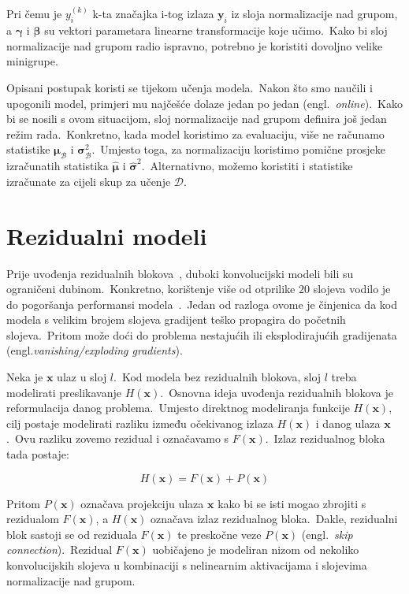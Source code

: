 \documentclass[diplomskirad]{fer}
\begin{document}
Pri čemu je $y_i^{(k)}$ k-ta značajka i-tog izlaza $\bm{y}_i$ iz sloja normalizacije nad grupom, a $\bm{\gamma}$ i $\bm{\beta}$ su vektori parametara linearne transformacije koje učimo.\ 
Kako bi sloj normalizacije nad grupom radio ispravno, potrebno je koristiti dovoljno velike minigrupe.\ 

Opisani postupak koristi se tijekom učenja modela.\ Nakon što smo naučili i upogonili model, primjeri mu najčešće dolaze jedan po jedan (engl.\ \textit{online}).\ 
Kako bi se nosili s ovom situacijom, sloj normalizacije nad grupom definira još jedan režim rada.\ 
Konkretno, kada model koristimo za evaluaciju, više ne računamo statistike $\bm{\mu}_{\mathcal{B}}$ i $\bm{\sigma}_{\mathcal{B}}^2$.\ 
Umjesto toga, za normalizaciju koristimo pomične prosjeke izračunatih statistika $\bm{\hat{\mu}}$ i $\bm{\hat{\sigma}}^2$.\ Alternativno, možemo koristiti i statistike izračunate za cijeli skup za učenje $\mathcal{D}$.\

\pagebreak

\section{Rezidualni modeli}
\label{sek:residual}

Prije uvođenja rezidualnih blokova~\cite{he2016deep}, duboki konvolucijski modeli bili su ograničeni dubinom.\ Konkretno, korištenje više od otprilike $20$ slojeva vodilo je do pogoršanja performansi modela~\cite{he2016deep}.\ 
Jedan od razloga ovome je činjenica da kod modela s velikim brojem slojeva gradijent teško propagira do početnih slojeva.\ 
Pritom može doći do problema nestajućih ili eksplodirajućih gradijenata (engl.\textit{vanishing/exploding gradients}).\

Neka je $\bm{x}$ ulaz u sloj $l$.\ Kod modela bez rezidualnih blokova, sloj $l$ treba modelirati preslikavanje $H(\bm{x})$.\ 
Osnovna ideja uvođenja rezidualnih blokova je reformulacija danog problema.\ Umjesto direktnog modeliranja funkcije $H(\bm{x})$, cilj postaje modelirati razliku između očekivanog izlaza $H(\bm{x})$ i danog ulaza $\bm{x}$.\ 
Ovu razliku zovemo rezidual i označavamo s $F(\bm{x})$.\ Izlaz rezidualnog bloka tada postaje:

\begin{equation}
  H(\bm{x}) = F(\bm{x}) + P(\bm{x})
  \label{eq:residual_formula}
\end{equation}

Pritom $P(\bm{x})$ označava projekciju ulaza $\bm{x}$ kako bi se isti mogao zbrojiti s rezidualom $F(\bm{x})$, a $H(\bm{x})$ označava izlaz rezidualnog bloka.\ 
Dakle, rezidualni blok sastoji se od reziduala $F(\bm{x})$ te preskočne veze $P(\bm{x})$ (engl.\ \textit{skip connection}).\ 
Rezidual $F(\bm{x})$ uobičajeno je modeliran nizom od nekoliko konvolucijskih slojeva u kombinaciji s nelinearnim aktivacijama i slojevima normalizacije nad grupom.\  
\end{document}
